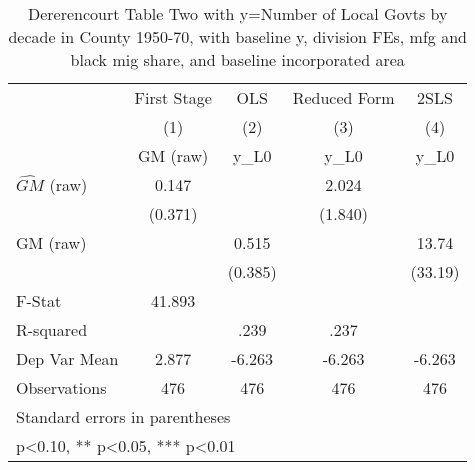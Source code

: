 \begin{table}[htbp]\centering
\def\sym#1{\ifmmode^{#1}\else\(^{#1}\)\fi}
\caption{Dererencourt Table Two with y=Number of Local Govts by decade in County 1950-70, with baseline y, division FEs, mfg and black mig share, and baseline incorporated area}
\begin{tabular}{l*{4}{c}}
\toprule
                    & First Stage   &         OLS   &Reduced Form   &        2SLS   \\
                    &\multicolumn{1}{c}{(1)}&\multicolumn{1}{c}{(2)}&\multicolumn{1}{c}{(3)}&\multicolumn{1}{c}{(4)}\\
                    &\multicolumn{1}{c}{GM  (raw)}&\multicolumn{1}{c}{y\_L0}&\multicolumn{1}{c}{y\_L0}&\multicolumn{1}{c}{y\_L0}\\
\midrule
$\hat{GM}$ (raw)    &       0.147   &               &       2.024   &               \\
                    &     (0.371)   &               &     (1.840)   &               \\
\addlinespace
GM  (raw)           &               &       0.515   &               &       13.74   \\
                    &               &     (0.385)   &               &     (33.19)   \\
\midrule
F-Stat              &      41.893   &               &               &               \\
R-squared           &               &        .239   &        .237   &               \\
Dep Var Mean        &       2.877   &      -6.263   &      -6.263   &      -6.263   \\
Observations        &         476   &         476   &         476   &         476   \\
\bottomrule
\multicolumn{5}{l}{\footnotesize Standard errors in parentheses}\\
\multicolumn{5}{l}{\footnotesize * p<0.10, ** p<0.05, *** p<0.01}\\
\end{tabular}
\end{table}

